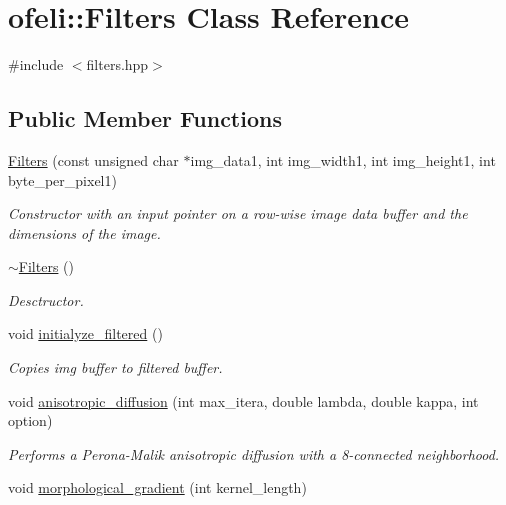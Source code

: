 \hypertarget{classofeli_1_1_filters}{\section{ofeli\-:\-:Filters Class Reference}
\label{classofeli_1_1_filters}
}


{\ttfamily \#include $<$filters.\-hpp$>$}

\subsection*{Public Member Functions}
\begin{DoxyCompactItemize}
\item 
\hypertarget{classofeli_1_1_filters_afdfd38460d9612c305776f4488a14546}{\hyperlink{classofeli_1_1_filters_afdfd38460d9612c305776f4488a14546}{Filters} (const unsigned char $\ast$img\-\_\-data1, int img\-\_\-width1, int img\-\_\-height1, int byte\-\_\-per\-\_\-pixel1)}\label{classofeli_1_1_filters_afdfd38460d9612c305776f4488a14546}

\begin{DoxyCompactList}\small\item\em Constructor with an input pointer on a row-\/wise image data buffer and the dimensions of the image. \end{DoxyCompactList}\item 
\hypertarget{classofeli_1_1_filters_aca1ba583de5930e46a3df2110ebbf21c}{\hyperlink{classofeli_1_1_filters_aca1ba583de5930e46a3df2110ebbf21c}{$\sim$\-Filters} ()}\label{classofeli_1_1_filters_aca1ba583de5930e46a3df2110ebbf21c}

\begin{DoxyCompactList}\small\item\em Desctructor. \end{DoxyCompactList}\item 
\hypertarget{classofeli_1_1_filters_a4bd1f0541cb045674548e292180fff0f}{void \hyperlink{classofeli_1_1_filters_a4bd1f0541cb045674548e292180fff0f}{initialyze\-\_\-filtered} ()}\label{classofeli_1_1_filters_a4bd1f0541cb045674548e292180fff0f}

\begin{DoxyCompactList}\small\item\em Copies {\itshape img} buffer to {\itshape filtered} buffer. \end{DoxyCompactList}\item 
void \hyperlink{classofeli_1_1_filters_ae4a65a5259b3a91a523eefdf2d90b920}{anisotropic\-\_\-diffusion} (int max\-\_\-itera, double lambda, double kappa, int option)
\begin{DoxyCompactList}\small\item\em Performs a Perona-\/\-Malik anisotropic diffusion with a 8-\/connected neighborhood. \end{DoxyCompactList}\item 
\hypertarget{classofeli_1_1_filters_a95fcd4385d6a115af0617407d91e6901}{void \hyperlink{classofeli_1_1_filters_a95fcd4385d6a115af0617407d91e6901}{morphological\-\_\-gradient} (int kernel\-\_\-length)}\label{classofeli_1_1_filters_a95fcd4385d6a115af0617407d91e6901}


\end{DoxyCompactItemize}
